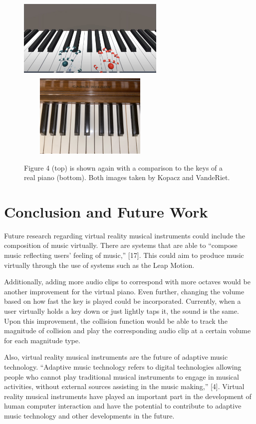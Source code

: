 \documentclass[conference,compsoc]{IEEEtran}
\begin{document}
\begin{figure}[h]
\centering
\includegraphics[width=7cm, height=4cm]{IEEEtran/UnityHands.JPG}
\includegraphics[width=7cm, height=4cm]{IEEEtran/IMG_9837.JPG}
\centering
\caption{Figure 4 (top) is shown again with a comparison to the keys of a real piano (bottom). Both images taken by Kopacz and VandeRiet.}
\end{figure}

\section{Conclusion and Future Work}
Future research regarding virtual reality musical instruments could include the composition of music virtually. There are systems that are able to “compose music reflecting users’ feeling of music,” [17]. This could aim to produce music virtually through the use of systems such as the Leap Motion. 

Additionally, adding more audio clips to correspond with more octaves would be another improvement for the virtual piano. Even further, changing the volume based on how fast the key is played could be incorporated. Currently, when a user virtually holds a key down or just lightly taps it, the sound is the same. Upon this improvement, the collision function would be able to track the magnitude of collision and play the corresponding audio clip at a certain volume for each magnitude type.

Also, virtual reality musical instruments are the future of adaptive music technology. “Adaptive music technology refers to digital technologies allowing people who cannot play traditional musical instruments to engage in musical activities, without external sources assisting in the music making,” [4]. Virtual reality musical instruments have played an important part in the development of human computer interaction and have the potential to contribute to adaptive music technology and other developments in the future.
\end{document}
